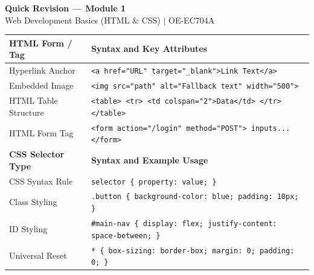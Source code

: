\documentclass[12pt,a4paper]{article}
\renewcommand{\arraystretch}{1.45}
\begin{document}
\newpage
\begin{center}
  {\large\bfseries\color{myred} Quick Revision --- Module 1}\\[3pt]
  {\small\color{mydark} Web Development Basics (HTML \& CSS) $|$ OE-EC704A}
\end{center}
\noindent{\color{myred}\rule{\linewidth}{1.2pt}}
\vspace{4pt}

\begin{tcolorbox}[formulabox, title={\textbf{Core HTML Tags \& CSS Syntax}}]
{\renewcommand{\arraystretch}{1.3}%
\begin{tabularx}{\linewidth}{l Y}
\textbf{HTML Form / Tag} & \textbf{Syntax and Key Attributes} \\
\hline
Hyperlink Anchor & \texttt{<a href="URL" target="\_blank">Link Text</a>} \\
Embedded Image & \texttt{<img src="path" alt="Fallback text" width="500">} \\
HTML Table Structure & \texttt{<table> <tr> <td colspan="2">Data</td> </tr> </table>} \\
HTML Form Tag & \texttt{<form action="/login" method="POST"> inputs... </form>} \\
\hline
\textbf{CSS Selector Type} & \textbf{Syntax and Example Usage} \\
\hline
CSS Syntax Rule & \texttt{selector \{ property: value; \}} \\
Class Styling & \texttt{.button \{ background-color: blue; padding: 10px; \}} \\
ID Styling & \texttt{\#main-nav \{ display: flex; justify-content: space-between; \}} \\
Universal Reset & \texttt{* \{ box-sizing: border-box; margin: 0; padding: 0; \}} \\
\end{tabularx}}
\end{tcolorbox}
\end{document}
